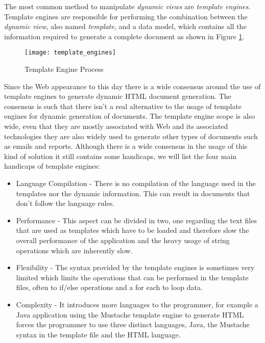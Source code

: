 \noindent
The most common method to manipulate \textit{dynamic views} are \textit{template engines}. Template engines are responsible for performing the combination between the \textit{dynamic view}, also named \textit{template}, and a data model, which contains all the information required to generate a complete document as shown in Figure \ref{img:templateengineprocess}.

\begin{figure}[H]
	\centering
	\texttt{[image: template\_engines]}
	\caption{Template Engine Process}
	\label{img:templateengineprocess}
\end{figure}

\noindent
Since the Web appearance to this day there is a wide consensus around the use of template engines to generate dynamic \ac{HTML} document generation. The consensus is such that there isn't a real alternative to the usage of template engines for dynamic generation of documents.  The template engine scope is also wide, even that they are mostly associated with Web and its associated technologies they are also widely used to generate other types of documents such as emails and reports. Although there is a wide consensus in the usage of this kind of solution it still contains some handicaps, we will list the four main handicaps of template engines:

\begin{itemize}
	\item Language Compilation - There is no compilation of the language used in the templates nor the dynamic information. This can result in documents that don't follow the language rules.
	\item Performance - This aspect can be divided in two, one regarding the text files that are used as templates which have to be loaded and therefore slow the overall performance of the application and the heavy usage of string operations which are inherently slow.
	\item Flexibility - The syntax provided by the template engines is sometimes very limited which limits the operations that can be performed in the template files, often to if/else operations and a for each to loop data.
	\item Complexity - It introduces more languages to the programmer, for example a Java application using the Mustache template engine to generate \ac{HTML} forces the programmer to use three distinct languages, Java, the Mustache syntax in the template file and the \ac{HTML} language.
\end{itemize}

